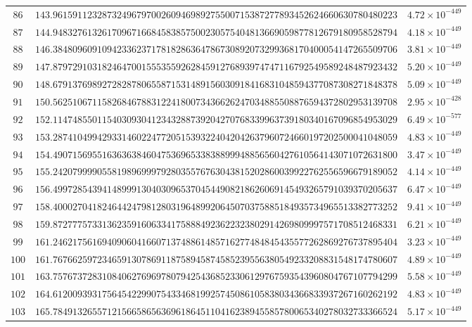 \documentclass[12pt,reqno]{amsart}
\theoremstyle{remark}
\begin{document}
\begin{longtable}{clc}
$86$ & $143.9615911232873249679700260946989275500715387277893452624660630780480223$ & $4.72\times 10^{-449}$ \\
$87$ & $144.9483276132617096716684583857500230575404813669059877812679180958528794$ & $4.18\times 10^{-449}$ \\
$88$ & $146.3848096091094233623717818286364786730892073299368170400054147265509706$ & $3.81\times 10^{-449}$ \\
$89$ & $147.8797291031824647001555355926284591276893974747116792549589248487923432$ & $5.20\times 10^{-449}$ \\
$90$ & $148.6791376989272828780655871531489156030918416831048594377087308271848378$ & $5.09\times 10^{-449}$ \\
$91$ & $150.5625106711582684678831224180073436626247034885508876594372802953139708$ & $2.95\times 10^{-428}$ \\
$92$ & $152.1147485501154030930412343288739204270768339963739180340167096854953029$ & $6.49\times 10^{-577}$ \\
$93$ & $153.2874104994293314602247720515393224042042637960724660197202500041048059$ & $4.83\times 10^{-449}$ \\
$94$ & $154.4907156955163636384604753696533838899948856560427610564143071072631800$ & $3.47\times 10^{-449}$ \\
$95$ & $155.2420799990558198969997928035576763043815202860039922762556596679189052$ & $4.14\times 10^{-449}$ \\
$96$ & $156.4997285439414899913040309653704544908218626069145493265791039370205637$ & $6.47\times 10^{-449}$ \\
$97$ & $158.4000270418246442479812803196489920645070375885184935734965513382773252$ & $9.41\times 10^{-449}$ \\
$98$ & $159.8727775733136235916063341758884923622323802914269809997571708512468331$ & $6.21\times 10^{-449}$ \\
$99$ & $161.2462175616940906041660713748861485716277484845435577262869276737895404$ & $3.23\times 10^{-449}$ \\
$100$ & $161.7676625972346591307869118758945874585239556380549233208831548174780607$ & $4.89\times 10^{-449}$ \\
$101$ & $163.7576737283108406276969780794254368523306129767593543960804767107794299$ & $5.58\times 10^{-449}$ \\
$102$ & $164.6120093931756454229907543346819925745086105838034366833937267160262192$ & $4.83\times 10^{-449}$ \\
$103$ & $165.7849132655712156658656369618645110416238945585780065340278032733366524$ & $5.17\times 10^{-449}$ \\

\end{longtable}
\end{document}
